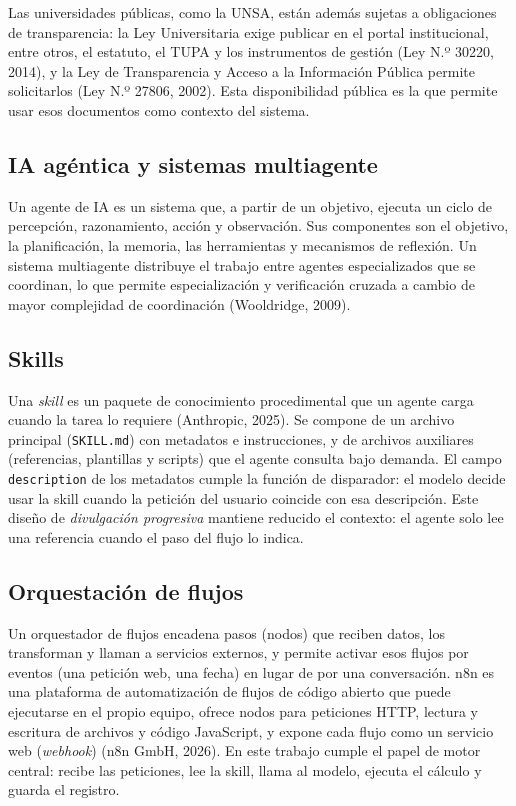 \documentclass[12pt,letterpaper]{article}
\begin{document}
Las universidades públicas, como la UNSA, están además sujetas a obligaciones de transparencia: la Ley Universitaria exige publicar en el portal institucional, entre otros, el estatuto, el TUPA y los instrumentos de gestión (Ley N.º 30220, 2014), y la Ley de Transparencia y Acceso a la Información Pública permite solicitarlos (Ley N.º 27806, 2002). Esta disponibilidad pública es la que permite usar esos documentos como contexto del sistema.

\subsection{IA agéntica y sistemas multiagente}

Un agente de IA es un sistema que, a partir de un objetivo, ejecuta un ciclo de percepción, razonamiento, acción y observación. Sus componentes son el objetivo, la planificación, la memoria, las herramientas y mecanismos de reflexión. Un sistema multiagente distribuye el trabajo entre agentes especializados que se coordinan, lo que permite especialización y verificación cruzada a cambio de mayor complejidad de coordinación (Wooldridge, 2009).

\subsection{Skills}

Una \emph{skill} es un paquete de conocimiento procedimental que un agente carga cuando la tarea lo requiere (Anthropic, 2025). Se compone de un archivo principal (\texttt{SKILL.md}) con metadatos e instrucciones, y de archivos auxiliares (referencias, plantillas y scripts) que el agente consulta bajo demanda. El campo \texttt{description} de los metadatos cumple la función de disparador: el modelo decide usar la skill cuando la petición del usuario coincide con esa descripción. Este diseño de \emph{divulgación progresiva} mantiene reducido el contexto: el agente solo lee una referencia cuando el paso del flujo lo indica.

\subsection{Orquestación de flujos}

Un orquestador de flujos encadena pasos (nodos) que reciben datos, los transforman y llaman a servicios externos, y permite activar esos flujos por eventos (una petición web, una fecha) en lugar de por una conversación. n8n es una plataforma de automatización de flujos de código abierto que puede ejecutarse en el propio equipo, ofrece nodos para peticiones HTTP, lectura y escritura de archivos y código JavaScript, y expone cada flujo como un servicio web (\emph{webhook}) (n8n GmbH, 2026). En este trabajo cumple el papel de motor central: recibe las peticiones, lee la skill, llama al modelo, ejecuta el cálculo y guarda el registro.
\end{document}
